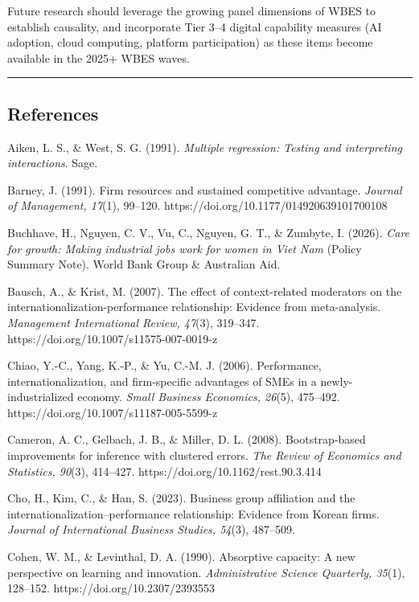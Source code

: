 \documentclass[
  12pt,a4paper]{article}
\begin{document}
Future research should leverage the growing panel dimensions of WBES to
establish causality, and incorporate Tier 3--4 digital capability
measures (AI adoption, cloud computing, platform participation) as these
items become available in the 2025+ WBES waves.

\begin{center}\rule{0.5\linewidth}{0.5pt}\end{center}

\hypertarget{references}{%
\subsection{References}\label{references}}

Aiken, L. S., \& West, S. G. (1991). \emph{Multiple regression: Testing
and interpreting interactions}. Sage.

Barney, J. (1991). Firm resources and sustained competitive advantage.
\emph{Journal of Management, 17}(1), 99--120.
https://doi.org/10.1177/014920639101700108

Buchhave, H., Nguyen, C. V., Vu, C., Nguyen, G. T., \& Zumbyte, I.
(2026). \emph{Care for growth: Making industrial jobs work for women in
Viet Nam} (Policy Summary Note). World Bank Group \& Australian Aid.

Bausch, A., \& Krist, M. (2007). The effect of context-related
moderators on the internationalization-performance relationship:
Evidence from meta-analysis. \emph{Management International Review,
47}(3), 319--347. https://doi.org/10.1007/s11575-007-0019-z

Chiao, Y.-C., Yang, K.-P., \& Yu, C.-M. J. (2006). Performance,
internationalization, and firm-specific advantages of SMEs in a
newly-industrialized economy. \emph{Small Business Economics, 26}(5),
475--492. https://doi.org/10.1007/s11187-005-5599-z

Cameron, A. C., Gelbach, J. B., \& Miller, D. L. (2008). Bootstrap-based
improvements for inference with clustered errors. \emph{The Review of
Economics and Statistics, 90}(3), 414--427.
https://doi.org/10.1162/rest.90.3.414

Cho, H., Kim, C., \& Han, S. (2023). Business group affiliation and the
internationalization--performance relationship: Evidence from Korean
firms. \emph{Journal of International Business Studies, 54}(3),
487--509.

Cohen, W. M., \& Levinthal, D. A. (1990). Absorptive capacity: A new
perspective on learning and innovation. \emph{Administrative Science
Quarterly, 35}(1), 128--152. https://doi.org/10.2307/2393553
\end{document}
